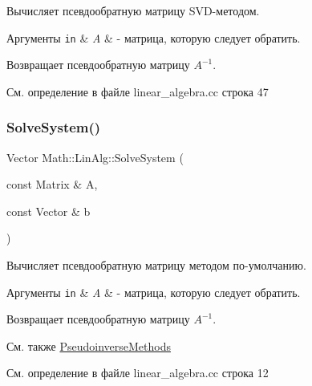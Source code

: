 Вычисляет псевдообратную матрицу S\+V\+D-\/методом. 


\begin{DoxyParams}[1]{Аргументы}
\mbox{\tt in}  & {\em A} & -\/ матрица, которую следует обратить. \\
\hline
\end{DoxyParams}
\begin{DoxyReturn}{Возвращает}
псевдообратную матрицу $A^{-1}$. 
\end{DoxyReturn}


См. определение в файле linear\+\_\+algebra.\+cc строка 47

\hypertarget{namespace_math_1_1_lin_alg_ab6e559246eac7fcd1bb0ef18fc4657ee}{}\label{namespace_math_1_1_lin_alg_ab6e559246eac7fcd1bb0ef18fc4657ee} 
\subsubsection{\texorpdfstring{Solve\+System()}{SolveSystem()}}
{\footnotesize\ttfamily Vector Math\+::\+Lin\+Alg\+::\+Solve\+System (\begin{DoxyParamCaption}\item[{const Matrix \&}]{A,  }\item[{const Vector \&}]{b }\end{DoxyParamCaption})}



Вычисляет псевдообратную матрицу методом по-\/умолчанию. 


\begin{DoxyParams}[1]{Аргументы}
\mbox{\tt in}  & {\em A} & -\/ матрица, которую следует обратить. \\
\hline
\end{DoxyParams}
\begin{DoxyReturn}{Возвращает}
псевдообратную матрицу $A^{-1}$. 
\end{DoxyReturn}
\begin{DoxySeeAlso}{См. также}
\hyperlink{namespace_math_1_1_lin_alg_a34ee452c5d64eeb10e1bb63cf887af17}{Pseudoinverse\+Methods} 


\end{DoxySeeAlso}


См. определение в файле linear\+\_\+algebra.\+cc строка 12

